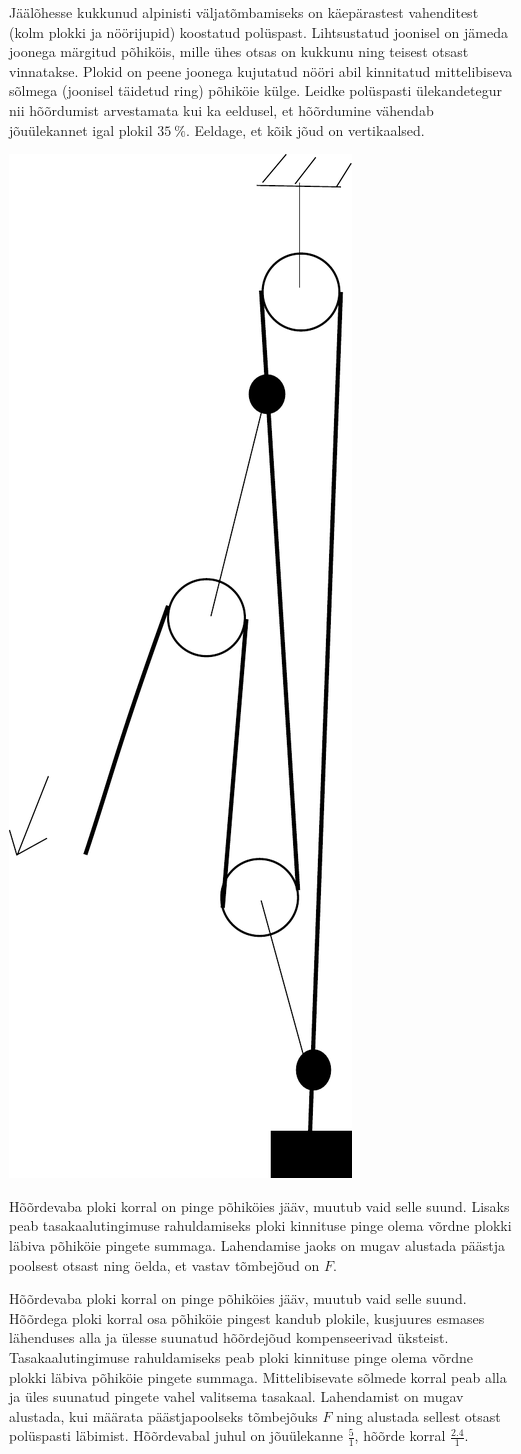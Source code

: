 
Jäälõhesse kukkunud alpinisti väljatõmbamiseks on käepärastest vahenditest (kolm plokki ja nöörijupid) koostatud polüspast. Lihtsustatud joonisel on jämeda joonega märgitud põhiköis, mille ühes otsas on kukkunu ning teisest otsast vinnatakse. Plokid on peene joonega kujutatud nööri abil kinnitatud mittelibiseva sõlmega (joonisel täidetud ring) põhiköie külge. Leidke polüspasti ülekandetegur nii hõõrdumist arvestamata kui ka eeldusel, et hõõrdumine vähendab jõuülekannet igal plokil $\SI{35}{\percent}$. Eeldage, et kõik jõud on vertikaalsed.

\begin{center}
\includegraphics[width=0.25\linewidth]{2014-v3g-06-Polyspast}
\end{center}

\hint
Hõõrdevaba ploki korral on pinge põhiköies jääv, muutub vaid selle suund. Lisaks peab tasakaalutingimuse rahuldamiseks ploki kinnituse pinge olema võrdne plokki läbiva põhiköie pingete summaga. Lahendamise jaoks on mugav alustada päästja poolsest otsast ning öelda, et vastav tõmbejõud on $F$.

\solu
Hõõrdevaba ploki korral on pinge põhiköies jääv, muutub vaid selle suund. Hõõrdega ploki korral osa põhiköie pingest kandub plokile, kusjuures esmases lähenduses alla ja ülesse suunatud hõõrdejõud kompenseerivad üksteist. Tasakaalutingimuse rahuldamiseks peab ploki kinnituse pinge olema võrdne plokki läbiva põhiköie pingete summaga. Mittelibisevate sõlmede korral peab alla ja üles suunatud pingete vahel valitsema tasakaal. Lahendamist on mugav alustada, kui määrata päästjapoolseks tõmbejõuks $F$ ning alustada sellest otsast polüspasti läbimist. Hõõrdevabal juhul on jõuülekanne $\frac{5}{1}$, hõõrde korral $\frac{\num{2,4}}{1}$.

